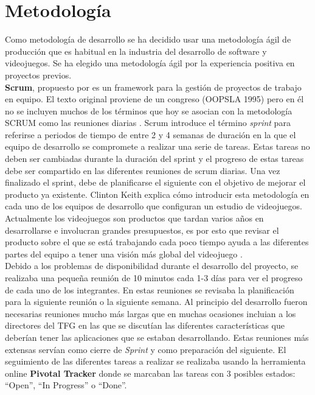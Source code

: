 \section{Metodolog\'ia}

Como metodolog\'ia de desarrollo se ha decidido usar una metodolog\'ia \'agil de producci\'on que es habitual en la industria del desarrollo de software y videojuegos. Se ha elegido una metodolog\'ia \'agil por la experiencia positiva en proyectos previos.\\

\textbf{Scrum}, propuesto por \cite{scrum} es un framework para la gesti\'on de proyectos de trabajo en equipo. El texto original proviene de un congreso (OOPSLA 1995) pero en \'el no se incluyen muchos de los t\'erminos que hoy se asocian con la metodolog\'ia SCRUM como las reuniones diarias \citep{scrum2}. Scrum introduce el t\'ermino \textit{sprint} para referirse a periodos de tiempo de entre 2 y 4 semanas de duraci\'on en la que el equipo de desarrollo se compromete a realizar una serie de tareas. Estas tareas no deben ser cambiadas durante la duraci\'on del sprint y el progreso de estas tareas debe ser compartido en las diferentes reuniones de scrum diarias. Una vez finalizado el sprint, debe de planificarse el siguiente con el objetivo de mejorar el producto ya existente. Clinton Keith explica c\'omo introducir esta metodolog\'ia en cada uno de los equipos de desarrollo que configuran un estudio de videojuegos. Actualmente los videojuegos son productos que tardan varios a\~nos en desarrollarse e involucran grandes presupuestos, es por esto que revisar el producto sobre el que se est\'a trabajando cada poco tiempo ayuda a las diferentes partes del equipo a tener una visi\'on m\'as global del videojuego \citep{keith2010agile}.  \\

Debido a los problemas de disponibilidad durante el desarrollo del proyecto, se realizaba una peque\~na reuni\'on de 10 minutos cada 1-3 d\'ias para ver el progreso de cada uno de los integrantes. En estas reuniones se revisaba la planificaci\'on para la siguiente reuni\'on o la siguiente semana. Al principio del desarrollo fueron necesarias reuniones mucho m\'as largas que en muchas ocasiones incluian a los directores del TFG en las que se discut\'ian las diferentes caracter\'isticas que deber\'ian tener las aplicaciones que se estaban desarrollando. Estas reuniones m\'as extensas serv\'ian como cierre de \textit{Sprint} y como preparaci\'on del siguiente. El seguimiento de las diferentes tareas a realizar se realizaba usando la herramienta online \textbf{Pivotal Tracker} donde se marcaban las tareas con 3 posibles estados: ``Open'', ``In Progress'' o ``Done''.


